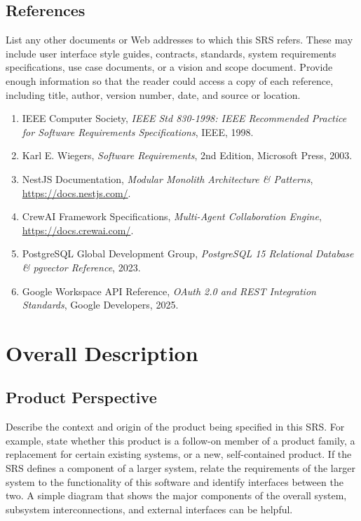 \documentclass[11pt,a4paper]{article}
\begin{document}
\subsection{References}
List any other documents or Web addresses to which this SRS refers. These may include user interface style guides, contracts, standards, system requirements specifications, use case documents, or a vision and scope document. Provide enough information so that the reader could access a copy of each reference, including title, author, version number, date, and source or location.

\begin{enumerate}
    \item IEEE Computer Society, \textit{IEEE Std 830-1998: IEEE Recommended Practice for Software Requirements Specifications}, IEEE, 1998.
    \item Karl E. Wiegers, \textit{Software Requirements}, 2nd Edition, Microsoft Press, 2003.
    \item NestJS Documentation, \textit{Modular Monolith Architecture \& Patterns}, \url{https://docs.nestjs.com/}.
    \item CrewAI Framework Specifications, \textit{Multi-Agent Collaboration Engine}, \url{https://docs.crewai.com/}.
    \item PostgreSQL Global Development Group, \textit{PostgreSQL 15 Relational Database \& pgvector Reference}, 2023.
    \item Google Workspace API Reference, \textit{OAuth 2.0 and REST Integration Standards}, Google Developers, 2025.
\end{enumerate}

\newpage
\section{Overall Description}

\subsection{Product Perspective}
Describe the context and origin of the product being specified in this SRS. For example, state whether this product is a follow-on member of a product family, a replacement for certain existing systems, or a new, self-contained product. If the SRS defines a component of a larger system, relate the requirements of the larger system to the functionality of this software and identify interfaces between the two. A simple diagram that shows the major components of the overall system, subsystem interconnections, and external interfaces can be helpful.
\end{document}
